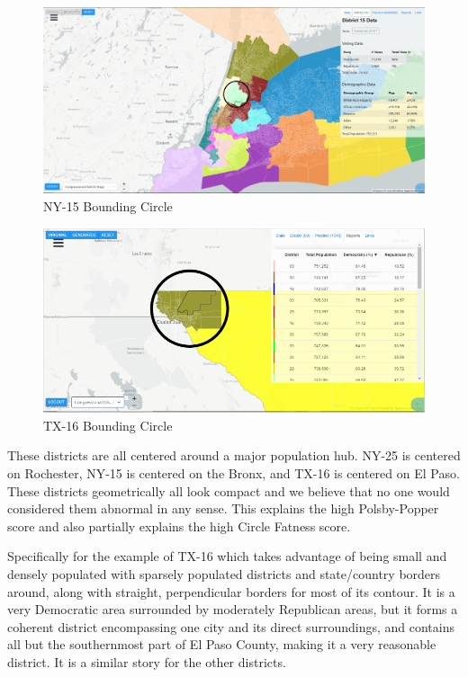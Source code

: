 \documentclass[letterpaper]{article}
\begin{document}
\begin{figure}[H]
	\includegraphics[width=\linewidth]{./figures/NY-15-BoundingCircle.png}
	\caption{NY-15 Bounding Circle}
	\label{fig:ny15boundingCircle}
\end{figure}

\begin{figure}[H]
	\includegraphics[width=\linewidth]{./figures/TX-16-BoundingCircle.png}
	\caption{TX-16 Bounding Circle}
	\label{fig:tx16boundingCircle}
\end{figure}

These districts are all centered around a major population hub. NY-25 is centered on Rochester, NY-15 is centered on the Bronx, and TX-16 is centered on El Paso. These districts geometrically all look compact and we believe that no one would considered them abnormal in any sense. This explains the high Polsby-Popper score and also partially explains the high Circle Fatness score. 

Specifically for the example of TX-16 which takes advantage of being small and densely populated with sparsely populated districts and state/country borders around, along with straight, perpendicular borders for most of its contour. It is a very Democratic area surrounded by moderately Republican areas, but it forms a coherent district encompassing one city and its direct surroundings, and contains all but the southernmost part of El Paso County, making it a very reasonable district. It is a similar story for the other districts.
\end{document}
